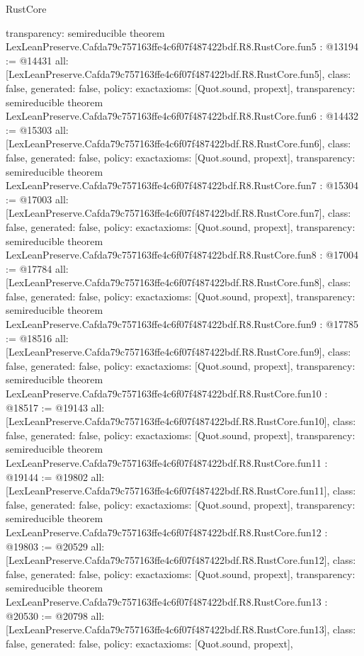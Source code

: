 \begin{lexlean}{RustCore}
\begin{coremodule}
{  transparency: semireducible
}
theorem LexLeanPreserve.Cafda79c757163ffe4c6f07f487422bdf.R8.RustCore.fun5 : @13194 := @14431 {
  all: [LexLeanPreserve.Cafda79c757163ffe4c6f07f487422bdf.R8.RustCore.fun5],
  class: false,
  generated: false,
  policy: exact{axioms: [Quot.sound, propext]},
  transparency: semireducible
}
theorem LexLeanPreserve.Cafda79c757163ffe4c6f07f487422bdf.R8.RustCore.fun6 : @14432 := @15303 {
  all: [LexLeanPreserve.Cafda79c757163ffe4c6f07f487422bdf.R8.RustCore.fun6],
  class: false,
  generated: false,
  policy: exact{axioms: [Quot.sound, propext]},
  transparency: semireducible
}
theorem LexLeanPreserve.Cafda79c757163ffe4c6f07f487422bdf.R8.RustCore.fun7 : @15304 := @17003 {
  all: [LexLeanPreserve.Cafda79c757163ffe4c6f07f487422bdf.R8.RustCore.fun7],
  class: false,
  generated: false,
  policy: exact{axioms: [Quot.sound, propext]},
  transparency: semireducible
}
theorem LexLeanPreserve.Cafda79c757163ffe4c6f07f487422bdf.R8.RustCore.fun8 : @17004 := @17784 {
  all: [LexLeanPreserve.Cafda79c757163ffe4c6f07f487422bdf.R8.RustCore.fun8],
  class: false,
  generated: false,
  policy: exact{axioms: [Quot.sound, propext]},
  transparency: semireducible
}
theorem LexLeanPreserve.Cafda79c757163ffe4c6f07f487422bdf.R8.RustCore.fun9 : @17785 := @18516 {
  all: [LexLeanPreserve.Cafda79c757163ffe4c6f07f487422bdf.R8.RustCore.fun9],
  class: false,
  generated: false,
  policy: exact{axioms: [Quot.sound, propext]},
  transparency: semireducible
}
theorem LexLeanPreserve.Cafda79c757163ffe4c6f07f487422bdf.R8.RustCore.fun10 : @18517 := @19143 {
  all: [LexLeanPreserve.Cafda79c757163ffe4c6f07f487422bdf.R8.RustCore.fun10],
  class: false,
  generated: false,
  policy: exact{axioms: [Quot.sound, propext]},
  transparency: semireducible
}
theorem LexLeanPreserve.Cafda79c757163ffe4c6f07f487422bdf.R8.RustCore.fun11 : @19144 := @19802 {
  all: [LexLeanPreserve.Cafda79c757163ffe4c6f07f487422bdf.R8.RustCore.fun11],
  class: false,
  generated: false,
  policy: exact{axioms: [Quot.sound, propext]},
  transparency: semireducible
}
theorem LexLeanPreserve.Cafda79c757163ffe4c6f07f487422bdf.R8.RustCore.fun12 : @19803 := @20529 {
  all: [LexLeanPreserve.Cafda79c757163ffe4c6f07f487422bdf.R8.RustCore.fun12],
  class: false,
  generated: false,
  policy: exact{axioms: [Quot.sound, propext]},
  transparency: semireducible
}
theorem LexLeanPreserve.Cafda79c757163ffe4c6f07f487422bdf.R8.RustCore.fun13 : @20530 := @20798 {
  all: [LexLeanPreserve.Cafda79c757163ffe4c6f07f487422bdf.R8.RustCore.fun13],
  class: false,
  generated: false,
  policy: exact{axioms: [Quot.sound, propext]},
}
\end{coremodule}
\end{lexlean}
